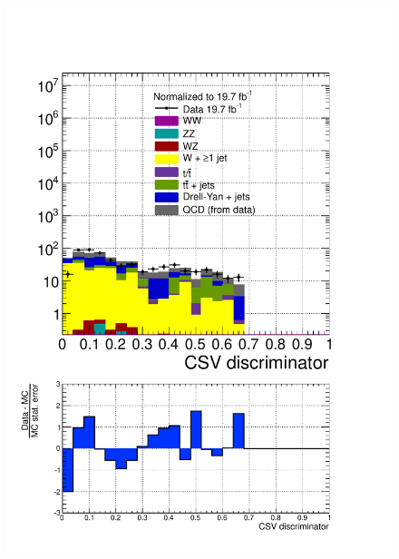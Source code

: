 \begin{figure}[hbtp]
  \begin{center}
    \includegraphics[width=\cmsFigWidth]{figures/dataVsMCQCD_CSV_lowMT_v87}

\end{center}
\end{figure}

